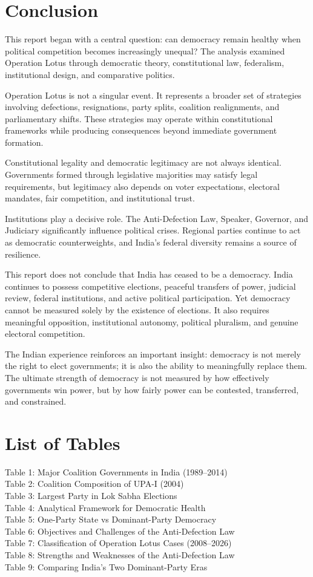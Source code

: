\documentclass[11pt]{article}
\begin{document}
\section{Conclusion}
This report began with a central question: can democracy remain healthy when political competition becomes increasingly unequal? The analysis examined Operation Lotus through democratic theory, constitutional law, federalism, institutional design, and comparative politics.

Operation Lotus is not a singular event. It represents a broader set of strategies involving defections, resignations, party splits, coalition realignments, and parliamentary shifts. These strategies may operate within constitutional frameworks while producing consequences beyond immediate government formation.

Constitutional legality and democratic legitimacy are not always identical. Governments formed through legislative majorities may satisfy legal requirements, but legitimacy also depends on voter expectations, electoral mandates, fair competition, and institutional trust.

Institutions play a decisive role. The Anti-Defection Law, Speaker, Governor, and Judiciary significantly influence political crises. Regional parties continue to act as democratic counterweights, and India's federal diversity remains a source of resilience.

This report does not conclude that India has ceased to be a democracy. India continues to possess competitive elections, peaceful transfers of power, judicial review, federal institutions, and active political participation. Yet democracy cannot be measured solely by the existence of elections. It also requires meaningful opposition, institutional autonomy, political pluralism, and genuine electoral competition.

The Indian experience reinforces an important insight: democracy is not merely the right to elect governments; it is also the ability to meaningfully replace them. The ultimate strength of democracy is not measured by how effectively governments win power, but by how fairly power can be contested, transferred, and constrained.

\newpage
\section*{List of Tables}
Table 1: Major Coalition Governments in India (1989--2014)\\
Table 2: Coalition Composition of UPA-I (2004)\\
Table 3: Largest Party in Lok Sabha Elections\\
Table 4: Analytical Framework for Democratic Health\\
Table 5: One-Party State vs Dominant-Party Democracy\\
Table 6: Objectives and Challenges of the Anti-Defection Law\\
Table 7: Classification of Operation Lotus Cases (2008--2026)\\
Table 8: Strengths and Weaknesses of the Anti-Defection Law\\
Table 9: Comparing India's Two Dominant-Party Eras
\end{document}
